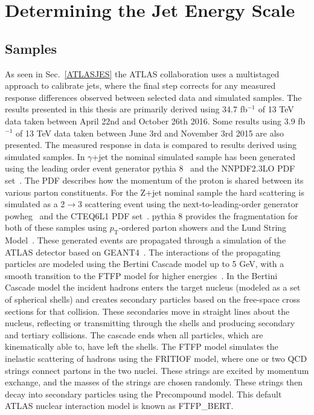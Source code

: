 \chapter{Determining the Jet Energy Scale}
\label{JES2}

\section{Samples}
\label{Sec:Samples}
As seen in Sec.~\ref{ATLASJES} the ATLAS collaboration uses a multistaged approach to calibrate jets, where the final step corrects for any measured response differences observed between selected data and simulated samples.  
The results presented in this thesis are primarily derived using 34.7 fb$^{-1}$ of 13 TeV data taken between April 22nd and October 26th 2016. 
Some results using 3.9 fb$^{-1}$ of 13 TeV data taken between June 3rd and November 3rd 2015 are also presented.  
The measured response in data is compared to results derived using simulated samples.  
In $\gamma$+jet the nominal simulated sample has been generated using the leading order event generator {\sc pythia} 8~\cite{Sjostrand:2007gs} and the NNPDF2.3LO \gls{PDF} set~\cite{Ball:2013hta}.  
The PDF describes how the momentum of the proton is shared between its various parton constituents.  
For the Z+jet nominal sample the hard scattering is simulated as a 2$\rightarrow$3 scattering event using the next-to-leading-order generator {\sc powheg}~\cite{Nason:2004rx, Frixione:2007vw, Alioli:2010xd} and the CTEQ6L1 PDF set~\cite{Pumplin:2002vw}.   
{\sc pythia} 8 provides the fragmentation for both of these samples using $p_{\mathrm T}$-ordered parton showers and the Lund String Model~\cite{ANDERSSON198331}.  
These generated events are propagated through a simulation of the ATLAS detector based on GEANT4~\cite{GEANT4}.  
The interactions of the propagating particles are modeled using the Bertini Cascade model up to 5 GeV, with a smooth transition to the FTFP model for higher energies~\cite{GEANT4Man}.  
In the Bertini Cascade model the incident hadrons enters the target nucleus (modeled as a set of spherical shells) and creates secondary particles based on the free-space cross sections for that collision.  
These secondaries move in straight lines about the nucleus, reflecting or transmitting through the shells and producing secondary and tertiary collisions.  
The cascade ends when all particles, which are kinematically able to, have left the shells.  
The FTFP model simulates the inelastic scattering of hadrons using the FRITIOF model, where one or two QCD strings connect partons in the two nuclei.  
These strings are excited by momentum exchange, and the masses of the strings are chosen randomly.  
These strings then decay into secondary particles using the Precompound model.  
This default ATLAS nuclear interaction model is known as FTFP\_BERT.
 



